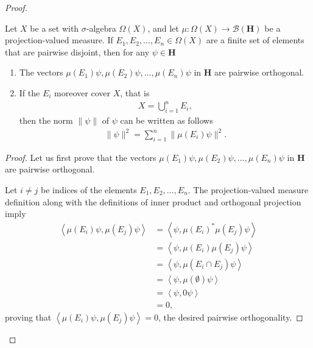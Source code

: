 \begin{proof}
\begin{lemma}
    \label{lmm:lemma2-of-operator-valued-integration}
    \leanok
    Let $X$ be a set with $\sigma$-algebra $\Omega(X)$, and let $\mu : \Omega(X) \rightarrow \mathcal{B}(\mathbf{H})$ be a projection-valued measure. If $E_1, E_2, \ldots, E_n \in \Omega(X)$ are a finite set of elements that are pairwise disjoint, then for any $\psi \in \mathbf{H}$
    \begin{enumerate}
        \item The vectors $\mu(E_1)\psi, \mu(E_2)\psi, \ldots, \mu(E_n)\psi$ in $\mathbf{H}$ are pairwise orthogonal.
        \item If the $E_i$ moreover cover $X$, that is
        \begin{align}
            X = \bigcup\limits_{i = 1}^n E_i,
        \end{align}
        then the norm $\|\psi\|$ of $\psi$ can be written as follows
        \begin{align}
            \|\psi\|^2 = \sum_{i = 1}^n \|\mu(E_i)\psi\|^2.
        \end{align}
    \end{enumerate}
\end{lemma}
\begin{proof}
    \leanok
Let us first prove that the vectors $\mu(E_1)\psi, \mu(E_2)\psi, \ldots, \mu(E_n)\psi$ in $\mathbf{H}$ are pairwise orthogonal.

Let $i \neq j$ be indices of the elements $E_1, E_2, \ldots, E_n$. The projection-valued measure definition along with the definitions of inner product and orthogonal projection imply
\begin{align}
    \left< \mu(E_i)\psi, \mu(E_j)\psi \right> &= \left< \psi, \mu(E_i)^* \mu(E_j)\psi \right> \\
                                              &= \left< \psi, \mu(E_i) \mu(E_j)\psi \right> \\
                                              &= \left< \psi, \mu(E_i \cap E_j)\psi \right> \\
                                              &= \left< \psi, \mu(\emptyset)\psi \right> \\
                                              &= \left< \psi, 0\psi \right> \\
                                              &= 0,
\end{align}
proving that $\left< \mu(E_i)\psi, \mu(E_j)\psi \right> = 0$, the desired pairwise orthogonality.


\end{proof}
\end{proof}
